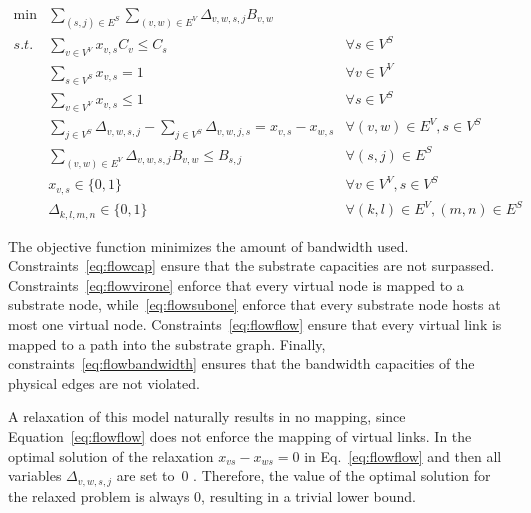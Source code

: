 \documentclass[article]{llncs}
\begin{document}

\begin{align}
    \min & \sum\limits_{(s,j) \in E^{S}} \sum\limits_{(v,w) \in E^{V}} \Delta_{v,w,s,j} B_{v,w} \nonumber \\
    s.t. & \sum\limits_{v \in V^{V}} x_{v,s} C_{v} \leq C_{s}                     & \forall s \in V^{S}  \label{eq:flowcap} \\
    & \sum\limits_{s \in V^{S}} x_{v,s} = 1                                  & \forall v \in V^{V}  \label{eq:flowvirone}\\
         & \sum\limits_{v \in V^{V}} x_{v,s} \leq 1                               & \forall s \in V^{S} \label{eq:flowsubone}\\
         & \sum\limits_{j \in V^{S}} \Delta_{v,w,s,j} - \sum\limits_{j \in V^{S}} \Delta_{v,w,j,s} = x_{v,s} - x_{w,s}  & \forall (v,w) \in E^{V}, s \in V^{S}\label{eq:flowflow} \\
         & \sum\limits_{(v,w) \in E^{V}} \Delta_{v,w,s,j} B_{v,w} \leq B_{s,j}  & \forall (s,j) \in E^{S} \label{eq:flowbandwidth} \\
         & x_{v,s} \in \{0,1\} & \forall v \in V^{V}, s \in V^{S} \\
         & \Delta_{k,l,m,n} \in \{0,1\} & \forall (k,l) \in E^{V}, (m,n) \in E^{S}
\end{align} 

The objective function minimizes the amount of bandwidth used. 
Constraints~\eqref{eq:flowcap} ensure that the substrate capacities are not surpassed. 
Constraints~\eqref{eq:flowvirone} enforce that every virtual node is mapped to a substrate node, while~\eqref{eq:flowsubone} enforce that every substrate node hosts at most one virtual node. 
Constraints~\eqref{eq:flowflow}
ensure that every virtual link is mapped to a path into the substrate graph. Finally, constraints~\eqref{eq:flowbandwidth} ensures that the bandwidth capacities of the physical edges are not violated.

A relaxation of this model naturally results in no mapping, since Equation~\eqref{eq:flowflow} does not enforce the mapping of virtual links. 
In the optimal solution of the relaxation $x_{vs}-x_{ws}=0$ in Eq.~\ref{eq:flowflow}  and then
all variables $\Delta_{v,w,s,j}$ are set to~$0$ . 
Therefore, the value of the optimal solution for the relaxed problem is always $0$, resulting in a trivial lower bound.
\end{document}
